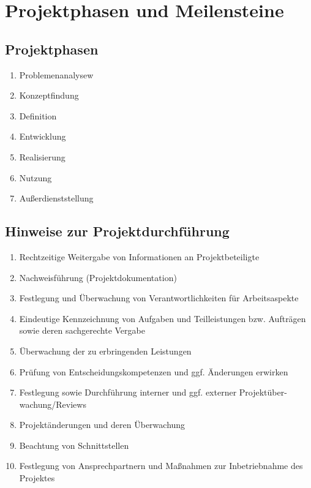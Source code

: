 \documentclass[11pt,a4paper]{article}
\begin{document}
\section{Projektphasen und Meilensteine}
\subsection{Projektphasen}
\begin{enumerate}
\item Problemenanalysew
\item Konzeptfindung
\item Definition
\item Entwicklung
\item Realisierung
\item Nutzung
\item Außerdienststellung
\end{enumerate}
\subsection{Hinweise zur Projektdurchführung}
\begin{enumerate}
\item Rechtzeitige Weitergabe von Informationen an Projektbeteiligte
\item Nachweisführung (Projektdokumentation)
\item Festlegung und Überwachung von Verantwortlichkeiten für Arbeitsaspekte
\item Eindeutige Kennzeichnung von Aufgaben und Teilleistungen bzw.
Aufträgen sowie deren sachgerechte Vergabe
\item Überwachung der zu erbringenden Leistungen
\item Prüfung von Entscheidungskompetenzen und ggf. Änderungen erwirken
\item Festlegung sowie Durchführung interner und ggf. externer Projektüber-
wachung/Reviews
\item Projektänderungen und deren Überwachung
\item Beachtung von Schnittstellen
\item Festlegung von Ansprechpartnern und Maßnahmen
zur Inbetriebnahme des Projektes
\end{enumerate}
\end{document}
